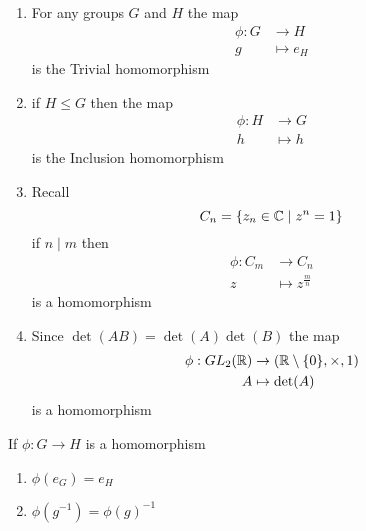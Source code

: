 \documentclass{article}
\begin{document}
\begin{eg}\leavevmode
    \begin{enumerate}
        \item For any groups $G$ and $H$ the map 
        \begin{align*}
            \phi: G &\rightarrow H \\
            g &\mapsto e_H
        \end{align*}
        is the Trivial homomorphism

        \item if $H \leq G$ then the map
        \begin{align*}
            \phi: H &\rightarrow G \\
            h &\mapsto h
        \end{align*}
        is the Inclusion homomorphism

        \item Recall
        \[
            C_n = \{z_n \in \mathbb{C} \mid z^n = 1\}  
        \]
        if $n \mid m$ then
        \begin{align*}
            \phi: C_m &\rightarrow C_n \\
            z &\mapsto z^\frac{m}{n}
        \end{align*}
        is a homomorphism

        \item Since $\det(AB) = \det(A)\det(B)$ the map
        \begin{align*}
            \phi: GL_2(\mathbb{R}) &\rightarrow (\mathbb{R} \setminus \{0\}, \times, 1) \\
            A &\mapsto \det(A)
        \end{align*}
        is a homomorphism
    \end{enumerate}
\end{eg}

\begin{lemma}
    If $\phi: G \rightarrow H$ is a homomorphism
    \begin{enumerate}
        \item $\phi(e_G) = e_H$
        \item $\phi(g^{-1}) = \phi(g)^{-1}$ 
    \end{enumerate}
\end{lemma}
\end{document}
